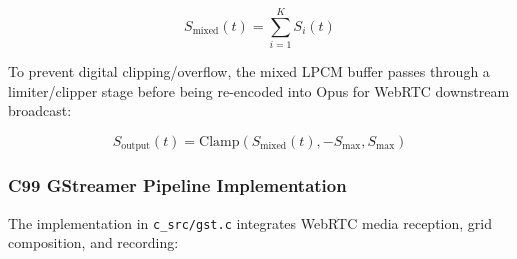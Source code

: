 \documentclass{article}
\begin{document}
\begin{equation}
S_{\text{mixed}}(t) = \sum_{i=1}^{K} S_i(t)
\end{equation}

To prevent digital clipping/overflow, the mixed LPCM buffer passes through a limiter/clipper stage
before being re-encoded into Opus for WebRTC downstream broadcast:

\begin{equation}
S_{\text{output}}(t) = \text{Clamp}(S_{\text{mixed}}(t), -S_{\text{max}}, S_{\text{max}})
\end{equation}

\newpage
\subsubsection{C99 GStreamer Pipeline Implementation}

The implementation in \texttt{c\_src/gst.c} integrates WebRTC media reception, grid composition, and recording:
\end{document}

